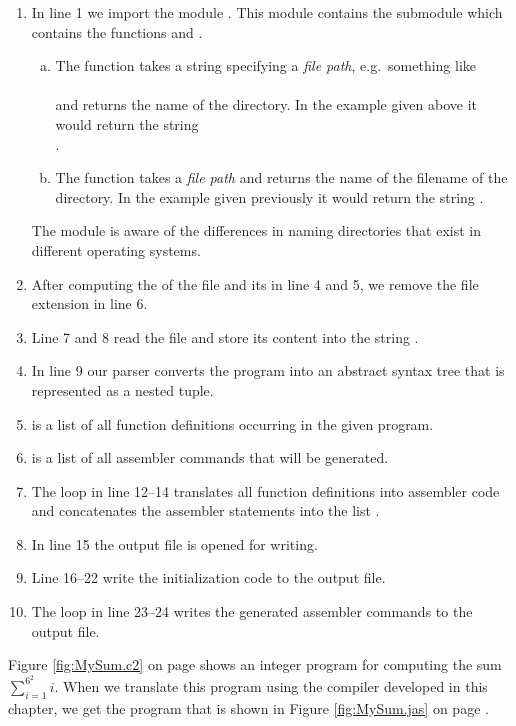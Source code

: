 \begin{enumerate}
\item In line 1 we import the module .  This module contains the submodule  which
      contains the functions   and .
      \begin{enumerate}[(a)]
      \item The function  takes a string specifying a \textsl{file path}, e.g.~something like
            \\[0.2cm]
            \hspace*{1.3cm}
            \\[0.2cm]
            and returns the name of the directory.  In the example given above it would return the string
            \\[0.2cm]
            \hspace*{1.3cm}
            . 
      \item The function  takes a \textsl{file path}
            and returns the name of the filename of the directory.  In the example given previously
            it would return the string .
      \end{enumerate}
      The module  is aware of the differences in naming directories that exist in different operating
      systems.     
\item After computing the  of the file and its  in line 4 and 5, we remove the 
      file extension  in line 6.
\item Line 7 and 8 read the file and store its content into the string .
\item In line 9 our parser converts the program into an abstract syntax tree that is represented as a nested
      tuple.  
\item {} is a list of all function definitions occurring in the given program.
\item {} is a list of all assembler commands that will be generated. 
\item The  loop in line 12--14 translates all function definitions into assembler code
      and concatenates the assembler statements into the list .
\item In line 15 the output file is opened for writing.
\item Line 16--22 write the initialization code to the output file.
\item The  loop in line 23--24 writes the generated assembler commands to the output file.
\end{enumerate}
Figure \ref{fig:MySum.c2} on page \pageref{fig:MySum.c2} shows an integer  program for computing the
sum $\sum\limits_{i=1}^{6^2}i$.  When we translate this program using the compiler developed in this chapter,
we get the program that is shown in Figure \ref{fig:MySum.jas} on page \pageref{fig:MySum.jas}.

